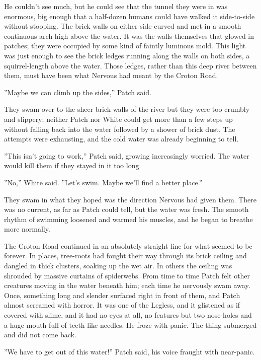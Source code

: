\documentclass[12pt]{book}
\begin{document}
 He couldn't see much, but he could see that the tunnel they were in was enormous, big enough that a half-dozen humans could have walked it side-to-side without stooping. The brick walls on either side curved and met in a smooth continuous arch high above the water. It was the walls themselves that glowed in patches; they were occupied by some kind of faintly luminous mold. This light was just enough to see the brick ledges running along the walls on both sides, a squirrel-length above the water. Those ledges, rather than this deep river between them, must have been what Nervous had meant by the Croton Road.\par
 ''Maybe we can climb up the sides,'' Patch said.\par
 They swam over to the sheer brick walls of the river %
 but they were too crumbly and slippery; neither Patch nor White could get more than a few steps up without falling back into the water followed by a shower of brick dust. The attempts were exhausting, and the cold water was already beginning to tell.\par
 ''This isn't going to work,'' Patch said, growing increasingly worried. The water would kill them if they stayed in it too long.\par
 ''No,'' White said. ''Let's swim. Maybe we'll find a better place.''\par
 They swam in what they hoped was the direction Nervous had given them. There was no current, as far as Patch could tell, but the water was fresh. The smooth rhythm of swimming loosened and warmed his muscles, and he began to breathe more normally.\par
 The Croton Road continued in an absolutely straight line for what seemed to be forever. In places, tree-roots had fought their way through its brick ceiling and dangled in thick clusters, soaking up the wet air. In others the ceiling was shrouded by massive curtains of spiderwebs. From time to time Patch felt other creatures moving in the water beneath him; each time he nervously swam away. Once, something long and slender surfaced right in front of them, and Patch almost screamed with horror. It was one of the Legless, and it glistened as if covered with slime, and it had no eyes at all, no features but two nose-holes and a huge mouth full of teeth like needles. He froze with panic. The thing submerged and did not come back.\par
 ''We have to get out of this water!'' Patch said, his voice fraught with near-panic.\par
\end{document}
